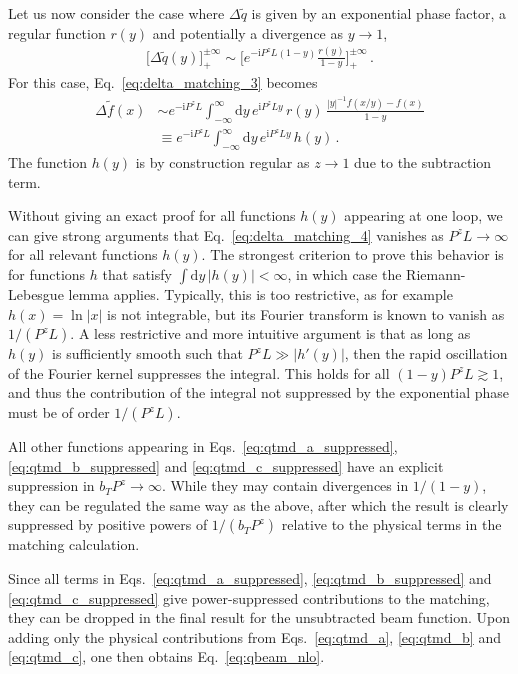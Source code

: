 \documentclass[11pt,a4paper]{article}
\DeclareRobustCommand{\eq}[1]{Eq.~\eqref{eq:#1}}
\DeclareRobustCommand{\eqss}[3]{Eqs.~\eqref{eq:#1}, \eqref{eq:#2} and \eqref{eq:#3}}
\newcommand{\df}{\mathrm{d}}
\newcommand{\img}{\mathrm{i}}
\newcommand{\nn}{\nonumber}
\newcommand{\plusinf}{_+^{\pm\infty}}
\begin{document}
Let us now consider the case where $\Delta\tilde q$ is given by an exponential phase factor, a regular function $r(y)$ and potentially a divergence as $y\to1$,
\begin{align}
 \bigl[\Delta \tilde q(y)\bigr]\plusinf \sim \biggl[ e^{-\img P^z L (1-y)} \frac{r(y)}{1-y} \biggr]\plusinf
\,.\end{align}
For this case, \eq{delta_matching_3} becomes
\begin{align} \label{eq:delta_matching_4}
  \Delta \tilde f(x) &
 \sim e^{-\img P^z L} \int_{-\infty}^\infty \df y \, e^{\img P^z L y} \, r(y) \, \frac{|y|^{-1} f(x/y) - f(x)}{1-y}
\nn\\&
 \equiv e^{-\img P^z L} \int_{-\infty}^\infty \df y \, e^{\img P^z L y} \, h(y)
\,.\end{align}
The function $h(y)$ is by construction regular as $z\to1$ due to the subtraction term.

Without giving an exact proof for all functions $h(y)$ appearing at one loop,
we can give strong arguments that \eq{delta_matching_4} vanishes as $P^z L \to \infty$ for all relevant functions $h(y)$.
The strongest criterion to prove this behavior is for functions $h$ that satisfy $\int \df y \, |h(y)| < \infty$, in which case the Riemann-Lebesgue lemma applies.
Typically, this is too restrictive, as for example $h(x) = \ln|x|$ is not integrable, but its Fourier transform is known to vanish as $1/(P^z L)$.
A less restrictive and more intuitive argument is that as long as $h(y)$ is sufficiently smooth such that $P^z L \gg |h'(y)|$, then the rapid oscillation of the Fourier kernel suppresses the integral.
This holds for all $(1-y) P^z L \gtrsim 1$, and thus the contribution of the integral not suppressed by the exponential phase must be of order $1/(P^z L)$.

All other functions appearing in \eqss{qtmd_a_suppressed}{qtmd_b_suppressed}{qtmd_c_suppressed} have an explicit suppression in $b_T P^z \to \infty$.
While they may contain divergences in $1/(1-y)$, they can be regulated the same way as the above,
after which the result is clearly suppressed by positive powers of $1/(b_T P^z)$ relative to the physical terms in the matching calculation.

Since all terms in \eqss{qtmd_a_suppressed}{qtmd_b_suppressed}{qtmd_c_suppressed} give power-suppressed contributions to the matching, they can be dropped in the final result for the unsubtracted beam function.
Upon adding only the physical contributions from \eqss{qtmd_a}{qtmd_b}{qtmd_c}, one then obtains \eq{qbeam_nlo}.



\end{document}

